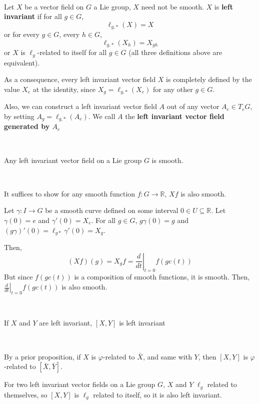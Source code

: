 \documentclass{article}
\begin{document}
\begin{definition}
  \

  Let $X$ be a vector field on $G$ a Lie group, $X$ need not be smooth. $X$ is \textbf{left invariant} if for all $g \in G$, $$\ell_{g, *}(X) = X$$or for every $g \in G$, every $h \in G$, $$\ell_{g, *}(X_h) = X_{gh}$$or $X$ is $\ell_g$-related to itself for all $g \in G$ (all three definitions above are equivalent).

  As a consequence, every left invariant vector field $X$ is completely defined by the value $X_e$ at the identity, since $X_g = \ell_{g, *}(X_e)$ for any other $g \in G$.

  Also, we can construct a left invariant vector field $A$ out of any vector $A_e \in T_eG$, by setting $A_g = \ell_{g, *}(A_e)$. We call $A$ the \textbf{left invariant vector field generated by $A_e$}
\end{definition}

\begin{proposition}
  \

  Any left invariant vector field on a Lie group $G$ is smooth.
\end{proposition}

\begin{customproof}
  \

  It suffices to show for any smooth function $f: G \to \mathbb{R}$, $Xf$ is also smooth.

  Let $\gamma: I \to G$ be a smooth curve defined on some interval $0 \in U \subseteq \mathbb{R}$. Let $\gamma(0) = e$ and $\gamma'(0) = X_e$. For all $g \in G$, $g\gamma(0) = g$ and $(g\gamma)'(0) = \ell_{g*}\gamma'(0) = X_g$.

  Then, $$(Xf)(g) = X_gf = \left.\frac{d}{dt}\right\vert_{t=0} f(gc(t))$$But since $f(gc(t))$ is a composition of smooth functions, it is smooth. Then, $ \left.\frac{d}{dt}\right\vert_{t=0} f(gc(t))$ is also smooth.
\end{customproof}

\begin{proposition}
  \

  If $X$ and $Y$ are left invariant, $[X,Y]$ is left invariant
\end{proposition}

\begin{customproof}
  \

  By a prior proposition, if $X$ is $\varphi$-related to $\bar{X}$, and same with $Y$, then $[X,Y]$ is $\varphi$-related to $[\bar{X}, \bar{Y}]$.

  For two left invariant vector fields on a Lie group $G$, $X$ and $Y$ $\ell_g$ related to themselves, so $[X,Y]$ is $\ell_g$ related to itself, so it is also left invariant.
\end{customproof}
\end{document}
